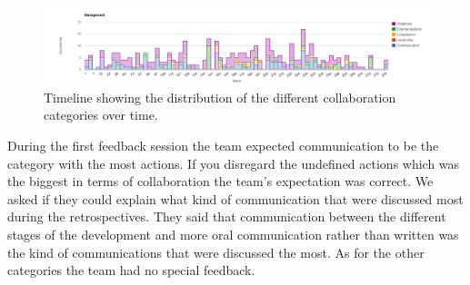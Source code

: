 \begin{table}[!h]
	\begin{center}
	\caption{Results from the content analysis regarding the collaboration influences of an action.}
	\label{table:collaboration-results}
	\end{center}
\end{table}

\begin{figure}
	\centering
	\includegraphics[width=\textwidth, keepaspectratio]{figures/management-l.png}
	\caption{Timeline showing the distribution of the different collaboration categories over time.}
	\label{figure-management-l}
\end{figure}
\afterpage{\clearpage}

During the first feedback session the team expected communication to be the category with the most actions. If you disregard the undefined actions which was the biggest in terms of collaboration the team's expectation was correct. We asked if they could explain what kind of communication that were discussed most during the retrospectives. They said that communication between the different stages of the development and more oral communication rather than written was the kind of communications that were discussed the most. As for the other categories the team had no special feedback.

